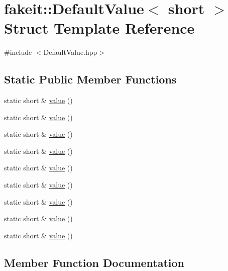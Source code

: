 \hypertarget{structfakeit_1_1DefaultValue_3_01short_01_4}{}\section{fakeit\+::Default\+Value$<$ short $>$ Struct Template Reference}
\label{structfakeit_1_1DefaultValue_3_01short_01_4}


{\ttfamily \#include $<$Default\+Value.\+hpp$>$}

\subsection*{Static Public Member Functions}
\begin{DoxyCompactItemize}
\item 
static short \& \mbox{\hyperlink{structfakeit_1_1DefaultValue_3_01short_01_4_aabb09583ac063be72c6c142a770b8b34}{value}} ()
\item 
static short \& \mbox{\hyperlink{structfakeit_1_1DefaultValue_3_01short_01_4_aabb09583ac063be72c6c142a770b8b34}{value}} ()
\item 
static short \& \mbox{\hyperlink{structfakeit_1_1DefaultValue_3_01short_01_4_aabb09583ac063be72c6c142a770b8b34}{value}} ()
\item 
static short \& \mbox{\hyperlink{structfakeit_1_1DefaultValue_3_01short_01_4_aabb09583ac063be72c6c142a770b8b34}{value}} ()
\item 
static short \& \mbox{\hyperlink{structfakeit_1_1DefaultValue_3_01short_01_4_aabb09583ac063be72c6c142a770b8b34}{value}} ()
\item 
static short \& \mbox{\hyperlink{structfakeit_1_1DefaultValue_3_01short_01_4_aabb09583ac063be72c6c142a770b8b34}{value}} ()
\item 
static short \& \mbox{\hyperlink{structfakeit_1_1DefaultValue_3_01short_01_4_aabb09583ac063be72c6c142a770b8b34}{value}} ()
\item 
static short \& \mbox{\hyperlink{structfakeit_1_1DefaultValue_3_01short_01_4_aabb09583ac063be72c6c142a770b8b34}{value}} ()
\item 
static short \& \mbox{\hyperlink{structfakeit_1_1DefaultValue_3_01short_01_4_aabb09583ac063be72c6c142a770b8b34}{value}} ()
\end{DoxyCompactItemize}


\subsection{Member Function Documentation}
\mbox{\label{structfakeit_1_1DefaultValue_3_01short_01_4_aabb09583ac063be72c6c142a770b8b34}} 
